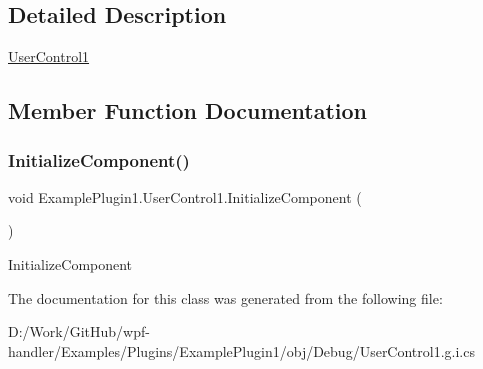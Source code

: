\subsection{Detailed Description}
\mbox{\hyperlink{class_example_plugin1_1_1_user_control1}{User\+Control1}} 



\subsection{Member Function Documentation}
\mbox{\label{class_example_plugin1_1_1_user_control1_a6ac0d2c2a87f20540773c5e37c22274f}} 
\subsubsection{\texorpdfstring{Initialize\+Component()}{InitializeComponent()}}
{\footnotesize\ttfamily void Example\+Plugin1.\+User\+Control1.\+Initialize\+Component (\begin{DoxyParamCaption}{ }\end{DoxyParamCaption})}



Initialize\+Component 



The documentation for this class was generated from the following file\+:\begin{DoxyCompactItemize}
\item 
D\+:/\+Work/\+Git\+Hub/wpf-\/handler/\+Examples/\+Plugins/\+Example\+Plugin1/obj/\+Debug/User\+Control1.\+g.\+i.\+cs\end{DoxyCompactItemize}

